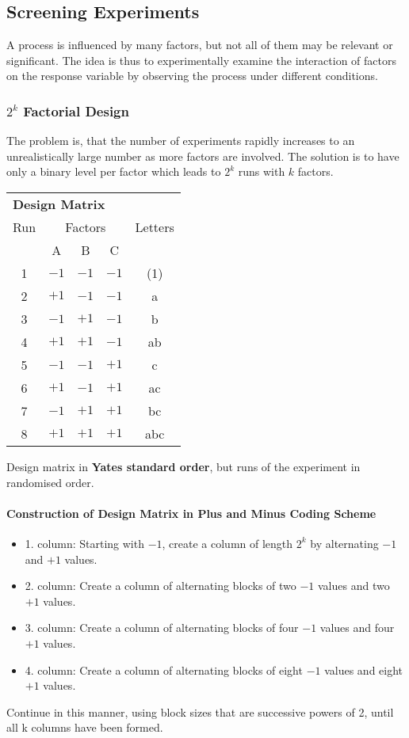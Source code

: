 \documentclass[11pt]{article}
\theoremstyle{definition}
\begin{document}
\subsection{Screening Experiments}
A process is influenced by many factors, but not all of them may be relevant or significant. The idea is thus to experimentally examine the interaction of factors on the response variable by observing the process under different conditions.

\subsubsection{$2^k$ Factorial Design}
The problem is, that the number of experiments rapidly increases to an unrealistically large number as more factors are involved. The solution is to have only a binary level per factor which leads to $2^k$ runs with $k$ factors.
\begin{tabularx}{\linewidth}{c | c c c | c}
	\multicolumn{5}{l}{\textbf{Design Matrix}}\\[0.5em]
	Run & \multicolumn{3}{c|}{Factors} & Letters\\
	& A & B & C & \\
	\hline
	1 & $-1$ & $-1$ & $-1$ & (1) \\
	2 & $+1$ & $-1$ & $-1$ & a   \\
	3 & $-1$ & $+1$ & $-1$ & b   \\
	4 & $+1$ & $+1$ & $-1$ & ab  \\
	5 & $-1$ & $-1$ & $+1$ & c   \\
	6 & $+1$ & $-1$ & $+1$ & ac  \\
	7 & $-1$ & $+1$ & $+1$ & bc  \\
	8 & $+1$ & $+1$ & $+1$ & abc \\
\end{tabularx}
Design matrix in \textbf{Yates standard order}, but runs of the experiment in randomised order.
\paragraph{Construction of Design Matrix in Plus and Minus Coding Scheme}
\begin{itemize}[nosep,label=]
	\item 1. column: Starting with $-1$, create a column of length $2^k$ by alternating $-1$ and $+1$ values.
	\item 2. column: Create a column of alternating blocks of two $-1$ values and two $+1$ values.
	\item 3. column: Create a column of alternating blocks of four $-1$ values and four $+1$ values.
	\item 4. column: Create a column of alternating blocks of eight $-1$ values and eight $+1$ values.
\end{itemize}
Continue in this manner, using block sizes that are successive powers of 2, until all k columns have been formed.
\end{document}
